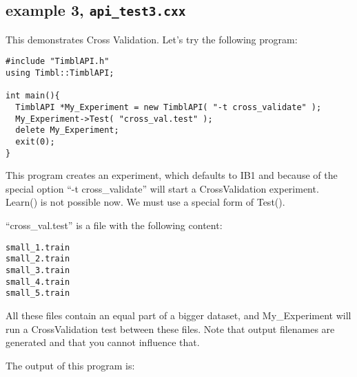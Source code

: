 \documentclass{report}
\begin{document}
\subsection{example 3, {\tt api\_test3.cxx}}

This demonstrates Cross Validation. Let's try the following program:

\begin{footnotesize}
\begin{verbatim}
#include "TimblAPI.h"
using Timbl::TimblAPI;

int main(){
  TimblAPI *My_Experiment = new TimblAPI( "-t cross_validate" );
  My_Experiment->Test( "cross_val.test" );  
  delete My_Experiment;
  exit(0);
}
\end{verbatim}
\end{footnotesize}

This program creates an experiment, which defaults to IB1 and because of the
special option ``-t cross\_validate'' will start a CrossValidation
experiment.\\
Learn() is not possible now. We must use a special form of Test().

``cross\_val.test'' is a file with the following content:
\begin{footnotesize}
\begin{verbatim}
small_1.train
small_2.train
small_3.train
small_4.train
small_5.train
\end{verbatim}
\end{footnotesize}


All these files contain an equal part of a bigger dataset, and
My\_Experiment will run a CrossValidation test between these files.
Note that output filenames are generated and that you cannot influence
that.

The output of this program is:
\end{document}
